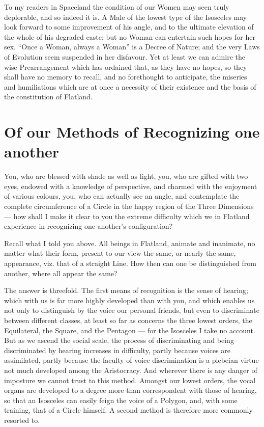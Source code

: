 \documentclass[12pt, a4paper, twoside]{memoir}
\begin{document}
To my readers in Spaceland the condition of our Women may seen truly
deplorable, and so indeed it is. A Male of the lowest type of the Isosceles
may look forward to some improvement of his angle, and to the ultimate
elevation of the whole of his degraded caste; but no Woman can entertain such
hopes for her sex. ``Once a Woman, always a Woman'' is a Decree of Nature; and
the very Laws of Evolution seem suspended in her disfavour. Yet at least we
can admire the wise Prearrangement which has ordained that, as they have no
hopes, so they shall have no memory to recall, and no forethought to
anticipate, the miseries and humiliations which are at once a necessity of
their existence and the basis of the constitution of Flatland.








\chapter{Of our Methods of Recognizing one another} You, who are blessed with
shade as well as light, you, who are gifted with two eyes, endowed with a
knowledge of perspective, and charmed with the enjoyment of various colours,
you, who can actually see an angle, and contemplate the complete circumference
of a Circle in the happy region of the Three Dimensions --- how shall I make it
clear to you the extreme difficulty which we in Flatland experience in
recognizing one another's configuration?

Recall what I told you above. All beings in Flatland, animate and inanimate,
no matter what their form, present to our view the same, or nearly the same,
appearance, viz. that of a straight Line. How then can one be distinguished
from another, where all appear the same?

The answer is threefold. The first means of recognition is the sense of
hearing; which with us is far more highly developed than with you, and which
enables us not only to distinguish by the voice our personal friends, but even
to discriminate between different classes, at least so far as concerns the
three lowest orders, the Equilateral, the Square, and the Pentagon --- for the
Isosceles I take no account. But as we ascend the social scale, the process of
discriminating and being discriminated by hearing increases in difficulty,
partly because voices are assimilated, partly because the faculty of
voice-discrimination is a plebeian virtue not much developed among the
Aristocracy. And wherever there is any danger of imposture we cannot trust to
this method. Amongst our lowest orders, the vocal organs are developed to a
degree more than correspondent with those of hearing, so that an Isosceles can
easily feign the voice of a Polygon, and, with some training, that of a Circle
himself. A second method is therefore more commonly resorted to.
\end{document}
